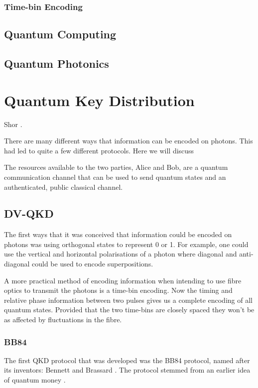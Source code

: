 \subsubsection{Time-bin Encoding}

\subsection{Quantum Computing}

\subsection{Quantum Photonics}

\section{Quantum Key Distribution}

Shor \cite{shor1994}.

There are many different ways that information can be encoded on photons. This had led to quite a few different protocols. Here we will discuss 

The resources available to the two parties, Alice and Bob, are a quantum communication channel that can be used to send quantum states and an authenticated, public classical channel. 

\subsection{DV-QKD}

The first ways that it was conceived that information could be encoded on photons was using orthogonal states to represent 0 or 1. For example, one could use the vertical and horizontal polarisations of a photon where diagonal and anti-diagonal could be used to encode superpositions. 

A more practical method of encoding information when intending to use fibre optics to transmit the photons is a time-bin encoding. Now the timing and relative phase information between two pulses gives us a complete encoding of all quantum states. Provided that the two time-bins are closely spaced they won't be as affected by fluctuations in the fibre.

\subsubsection*{BB84}

The first \ac{QKD} protocol that was developed was the BB84 protocol, named after its inventors: Bennett and Brassard \cite{BB84}. The protocol stemmed from an earlier idea of quantum money \cite{quantum_money}.

